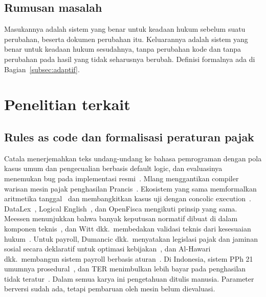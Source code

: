 \documentclass[journal,a4paper]{IEEEtran}
\makeatletter
\DeclareRobustCommand{\en}[1]{{\usefont{\f@encoding}{\f@family}{\f@series}{it}#1\/}}
\makeatother
\begin{document}
\subsection{Rumusan masalah}
Masukannya adalah sistem yang benar untuk keadaan hukum sebelum suatu perubahan, beserta dokumen perubahan itu. Keluarannya adalah sistem yang benar untuk keadaan hukum sesudahnya, tanpa perubahan kode dan tanpa perubahan pada hasil yang tidak seharusnya berubah. Definisi formalnya ada di Bagian~\ref{subsec:adaptif}.

\section{Penelitian terkait}
\label{sec:terkait}
\subsection{\en{Rules as code} dan formalisasi peraturan pajak}
Catala menerjemahkan teks undang-undang ke bahasa pemrograman dengan pola kasus umum dan pengecualian berbasis \en{default logic}, dan evaluasinya menemukan \en{bug} pada implementasi resmi~\cite{merigoux2021catala,huttner2022catala}. Mlang menggantikan \en{compiler} warisan mesin pajak penghasilan Prancis~\cite{merigoux2021mlang}. Ekosistem yang sama memformalkan aritmetika tanggal~\cite{monat2024date} dan membangkitkan kasus uji dengan \en{concolic execution}~\cite{goutagny2025cutecat}. DataLex~\cite{mowbray2023scaling,mowbray2023xai}, Logical English~\cite{kowalski2022logicalenglish}, dan OpenFisca mengikuti prinsip yang sama. Meessen menunjukkan bahwa banyak keputusan normatif dibuat di dalam komponen teknis~\cite{meessen2023arrows}, dan Witt dkk.\ membedakan validasi teknis dari kesesuaian hukum~\cite{witt2024encoding}. Untuk \en{payroll}, Dumancic dkk.\ menyatakan legislasi pajak dan jaminan sosial secara deklaratif untuk optimasi kebijakan~\cite{dumancic2021payroll}, dan Al-Hawari dkk.\ membangun sistem \en{payroll} berbasis aturan~\cite{alhawari2026payroll}. Di Indonesia, sistem PPh 21 umumnya prosedural~\cite{ramadhani2021grossup,yulistyawati2022payroll,kusuma2026pph21}, dan TER menimbulkan lebih bayar pada penghasilan tidak teratur~\cite{sherra2025ter}. Dalam semua karya ini pengetahuan ditulis manusia. Parameter berversi sudah ada, tetapi pembaruan oleh mesin belum dievaluasi.
\end{document}
